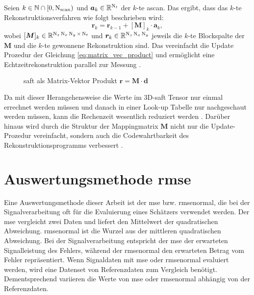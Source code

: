 Seien $k \in {\mathbb{N}} \cap [0, \operatorname{N}_{\operatorname{scan}})$ und $\bm{a}_{k} \in {\mathbb{R}}^{\operatorname{N}_t}$ der $k$-te \gls{ascan}. Das ergibt, dass das $k$-te Rekonstruktionsverfahren wie folgt beschrieben wird:
\begin{equation} \label{eq:saft_online_update}
\bm{r}_{k} = \bm{r}_{k-1} + [\bm{M}]_{k} \cdot \bm{a}_{k},
\end{equation}
wobei $[\bm{M}]_{k} \in {\mathbb{R}}^{\operatorname{N}_z \operatorname{N}_x \operatorname{N}_y \times \operatorname{N}_t}$ und $\bm{r}_{k} \in {\mathbb{R}}^{\operatorname{N}_z \operatorname{N}_x \operatorname{N}_y}$  jeweils die $k$-te Blockspalte der $\bm{M}$      und die $k$-te gewonnene Rekonstruktion sind. Das vereinfacht die Update Prozedur der Gleichung \ref{eq:matrix_vec_product} und ermöglicht eine Echtzeitrekonstruktion parallel zur Messung \cite{Krieg18ProgressiveOnline3DSAFT}. \par

\begin{figure}[h!]
\begin{center}
\caption[SAFT Matrix-Vektor Produkt]{\acrshort{saft} als Matrix-Vektor Produkt $\bm{r} = \bm{M} \cdot \bm{d}$  \cite{Krieg18ProgressiveOnline3DSAFT}}
\label{fig:saft_dict_2D}
\end{center}
\end{figure}

Da mit dieser Herangehensweise die Werte im 3D-\acrshort{saft} Tensor nur einmal errechnet werden müssen und danach in einer Look-up Tabelle nur nachgeschaut werden müssen, kann die Rechenzeit wesentlich reduziert werden \cite{Krieg18ProgressiveOnline3DSAFT}. Darüber hinaus wird durch die Struktur der Mappingmatrix $\bm{M}$ nicht nur die Update-Prozedur vereinfacht, sondern auch die Codewahrtbarkeit des Rekonstruktionsprogramms verbessert \cite{Krieg18ProgressiveOnline3DSAFT}. 


\section{Auswertungsmethode \acrfull{rmse}} \label{sec:mse}
Eine Auswertungsmethode dieser Arbeit ist der \acrfull{mse} bzw. \acrfull{rmsenormal}, die bei der Signalverarbeitung oft für die Evaluierung eines Schätzers verwendet werden. Der \acrshort{mse} vergleicht zwei Daten und liefert den Mittelwert der quadratischen Abweichung. \acrshort{rmsenormal} ist die Wurzel aus der mittleren quadratischen Abweichung. Bei der Signalverarbeitung entspricht der \acrshort{mse} der erwarteten Signalleistung des Fehlers, während der \acrshort{rmsenormal} den erwarteten Betrag vom Fehler repräsentiert. Wenn Signaldaten mit \acrshort{mse} oder \acrshort{rmsenormal} evaluiert werden, wird eine Datenset von Referenzdaten zum Vergleich benötigt. Dementsprechend variieren die Werte von \acrshort{mse} oder \acrshort{rmsenormal} abhängig von der Referenzdaten.  \par

